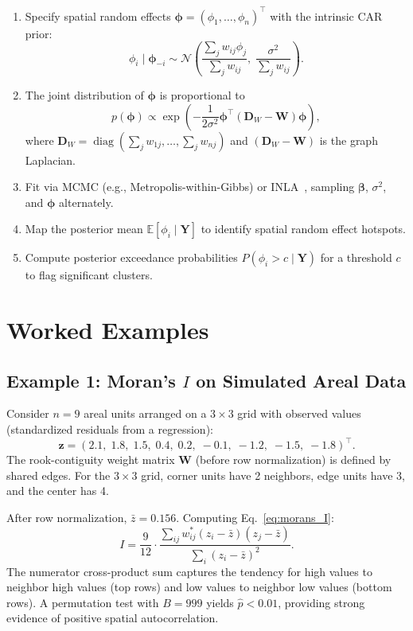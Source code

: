 \documentclass[conference]{IEEEtran}
\theoremstyle{definition}
\begin{document}
\begin{enumerate}
  \item Specify spatial random effects $\boldsymbol{\phi} = (\phi_1, \ldots, \phi_n)^\top$ with the intrinsic CAR prior:
    \[
    \phi_i \mid \boldsymbol{\phi}_{-i} \sim \mathcal{N}\!\left(\frac{\sum_j w_{ij} \phi_j}{\sum_j w_{ij}},\; \frac{\sigma^2}{\sum_j w_{ij}}\right).
    \]
  \item The joint distribution of $\boldsymbol{\phi}$ is proportional to
    \[
    p(\boldsymbol{\phi}) \propto \exp\!\left(-\frac{1}{2\sigma^2}\boldsymbol{\phi}^\top(\mathbf{D}_W - \mathbf{W})\boldsymbol{\phi}\right),
    \]
    where $\mathbf{D}_W = \operatorname{diag}(\sum_j w_{1j}, \ldots, \sum_j w_{nj})$ and $(\mathbf{D}_W - \mathbf{W})$ is the graph Laplacian.
  \item Fit via MCMC (e.g., Metropolis-within-Gibbs) or INLA~\cite{rue2009}, sampling $\boldsymbol{\beta}$, $\sigma^2$, and $\boldsymbol{\phi}$ alternately.
  \item Map the posterior mean $\mathbb{E}[\phi_i \mid \mathbf{Y}]$ to identify spatial random effect hotspots.
  \item Compute posterior exceedance probabilities $P(\phi_i > c \mid \mathbf{Y})$ for a threshold $c$ to flag significant clusters.
\end{enumerate}

\section{Worked Examples}
\label{sec:examples}

\subsection{Example 1: Moran's $I$ on Simulated Areal Data}

Consider $n = 9$ areal units arranged on a $3 \times 3$ grid with observed values (standardized residuals from a regression):
\[
\mathbf{z} = (2.1,\; 1.8,\; 1.5,\; 0.4,\; 0.2,\; -0.1,\; -1.2,\; -1.5,\; -1.8)^\top.
\]
The rook-contiguity weight matrix $\mathbf{W}$ (before row normalization) is defined by shared edges. For the $3 \times 3$ grid, corner units have 2 neighbors, edge units have 3, and the center has 4.

After row normalization, $\bar{z} = 0.156$. Computing Eq.~\eqref{eq:morans_I}:
\[
I = \frac{9}{12} \cdot \frac{\sum_{ij} w_{ij}^*(z_i-\bar{z})(z_j-\bar{z})}{\sum_i(z_i-\bar{z})^2}.
\]
The numerator cross-product sum captures the tendency for high values to neighbor high values (top rows) and low values to neighbor low values (bottom rows). A permutation test with $B = 999$ yields $\hat{p} < 0.01$, providing strong evidence of positive spatial autocorrelation.
\end{document}
